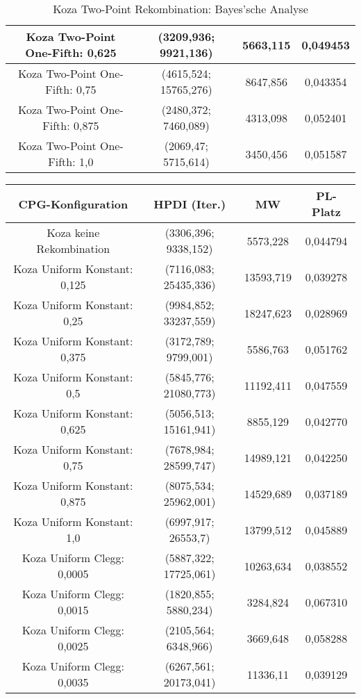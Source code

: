 \begin{table}[H]
\begin{tabular}{c | c | c | c}
		\hline
		Koza Two-Point One-Fifth: 0,625 & (3209,936; 9921,136) & 5663,115 & 0,049453\\
		\hline
		Koza Two-Point One-Fifth: 0,75 & (4615,524; 15765,276) & 8647,856 & 0,043354\\
		\hline
		Koza Two-Point One-Fifth: 0,875 & (2480,372; 7460,089) & 4313,098 & 0,052401\\
		\hline
		Koza Two-Point One-Fifth: 1,0 & (2069,47; 5715,614) & 3450,456 & 0,051587\\
	\end{tabular}
	\label{table:kozaTwoPointBayesian}
	\caption{Koza Two-Point Rekombination: Bayes'sche Analyse}
\end{table}


\begin{table}[H]
	\centering
	\begin{tabular}{c | c | c | c}
		\textbf{CPG-Konfiguration} & \textbf{HPDI (Iter.)} & \textbf{MW} & \textbf{PL-Platz}\\
		\hline
		Koza keine Rekombination & (3306,396; 9338,152) & 5573,228 & 0,044794\\
		\hline
		Koza Uniform Konstant: 0,125 & (7116,083; 25435,336) & 13593,719 & 0,039278\\
		\hline
		Koza Uniform Konstant: 0,25 & (9984,852; 33237,559) & 18247,623 & 0,028969\\
		\hline
		Koza Uniform Konstant: 0,375 & (3172,789; 9799,001) & 5586,763 & 0,051762\\
		\hline
		Koza Uniform Konstant: 0,5 & (5845,776; 21080,773) & 11192,411 & 0,047559\\
		\hline
		Koza Uniform Konstant: 0,625 & (5056,513; 15161,941) & 8855,129 & 0,042770\\
		\hline
		Koza Uniform Konstant: 0,75 & (7678,984; 28599,747) & 14989,121 & 0,042250\\
		\hline
		Koza Uniform Konstant: 0,875 & (8075,534; 25962,001) & 14529,689 & 0,037189\\
		\hline
		Koza Uniform Konstant: 1,0 & (6997,917; 26553,7) & 13799,512 & 0,045889\\
		\hline
		Koza Uniform Clegg: 0,0005 & (5887,322; 17725,061) & 10263,634 & 0,038552\\
		\hline
		Koza Uniform Clegg: 0,0015 & (1820,855; 5880,234) & 3284,824 & 0,067310\\
		\hline
		Koza Uniform Clegg: 0,0025 & (2105,564; 6348,966) & 3669,648 & 0,058288\\
		\hline
		Koza Uniform Clegg: 0,0035 & (6267,561; 20173,041) & 11336,11 & 0,039129\\

\end{tabular}
\end{table}
